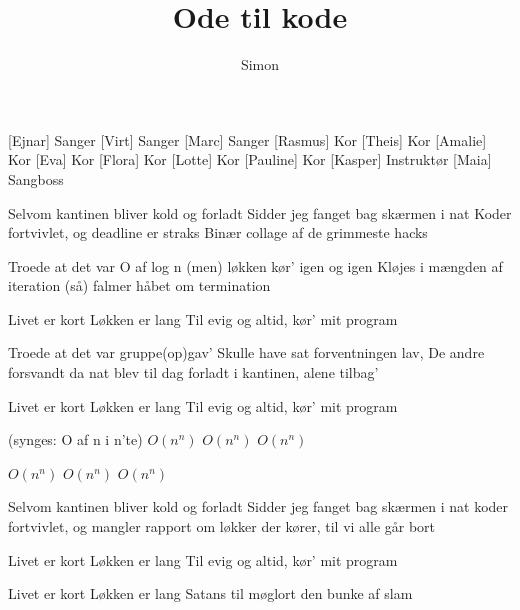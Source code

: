 \documentclass[a4paper,11pt]{article}
\title{Ode til kode}
\author{Simon}
\begin{document}
\maketitle

\begin{roles}
[Ejnar] Sanger
[Virt] Sanger
[Marc] Sanger
[Rasmus] Kor
[Theis] Kor
[Amalie] Kor
[Eva] Kor
[Flora] Kor
[Lotte] Kor
[Pauline] Kor
[Kasper] Instruktør
[Maia] Sangboss
\end{roles}

\begin{song}
%
Selvom kantinen bliver kold og forladt
Sidder jeg fanget bag skærmen i nat
Koder fortvivlet, og deadline er straks
Binær collage af de grimmeste hacks

%
Troede at det var O af log n
(men) løkken kør' igen og igen
Kløjes i mængden af iteration
(så) falmer håbet om termination

%
Livet er kort
Løkken er lang
Til evig og altid, kør' mit program

%
Troede at det var gruppe(op)gav'
Skulle have sat forventningen lav,
De andre forsvandt da nat blev til dag
forladt i kantinen, alene tilbag'

%
Livet er kort
Løkken er lang
Til evig og altid, kør' mit program

(synges: O af n i n'te)
%
$O(n^n)$
$O(n^n)$
$O(n^n)$

%
$O(n^n)$
$O(n^n)$
$O(n^n)$

%
Selvom kantinen bliver kold og forladt
Sidder jeg fanget bag skærmen i nat
koder fortvivlet, og mangler rapport
om løkker der kører, til vi alle går bort

%
Livet er kort
Løkken er lang
Til evig og altid, kør' mit program

%
Livet er kort
Løkken er lang
Satans til møglort den bunke af slam

\end{song}
\end{document}

